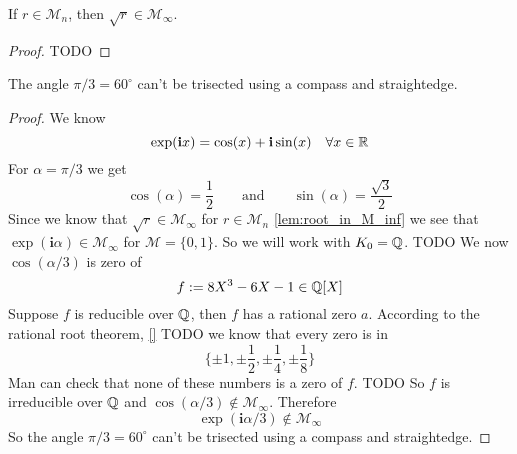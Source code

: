 \documentclass{../Project/TemplateExercise}
\begin{document}
\begin{lemma}
\label{lem:root_in_M_inf}
    If $r\in \mathcal{M}_{n}$, then $\sqrt{r} \in \mathcal{M}_{\infty}$.
\end{lemma}
\begin{proof}
    TODO %
\end{proof}
\begin{lemma}

\end{lemma}
\begin{theorem}
    The angle $\pi / 3 = 60^{\circ}$ can't be trisected using a compass and straightedge.
\end{theorem}
\begin{proof}
    We know
    \begin{equation*}
        \exp(\textbf{i}x) = \cos(x) + \textbf{i} \sin(x) \quad \forall x \in \mathbb{R}
    \end{equation*}
    For $\alpha = \pi / 3$ we get
    \begin{equation*}
        \cos(\alpha) = \frac{1}{2}\qquad \text{and}\qquad \sin(\alpha) = \frac{\sqrt{3}}{2}
    \end{equation*}
    Since we know that $\sqrt{r} \in \mathcal{M}_{\infty}$ for $r \in \mathcal{M}_n$ \ref*{lem:root_in_M_inf}
    we see that $\exp(\textbf{i} \alpha) \in \mathcal{M}_{\infty}$ for $\mathcal{M} = \{0,1\}$. \newline
    So we will work with $K_0 = \mathbb{Q}$. \newline
    TODO \newline %
    We now $\cos(\alpha/3)$ is zero of
    \begin{equation*}
        f := 8 X^3 - 6 X - 1 \in \mathbb{Q}[X]
    \end{equation*}
    Suppose $f$ is reducible over $\mathbb{Q}$, then $f$ has a rational zero $a$. According to the rational root theorem, \ref*{}
        TODO %
     we know that every zero is in
     \begin{equation*}
        \{ \pm 1, \pm \frac{1}{2}, \pm \frac{1}{4}, \pm \frac{1}{8} \}
     \end{equation*}
     Man can check that none of these numbers is a zero of $f$.
     TODO %
     So $f$ is irreducible over $\mathbb{Q}$ and $\cos(\alpha/3) \notin \mathcal{M}_{\infty}$.
     Therefore
        \begin{equation*}
            \exp(\textbf{i} \alpha/3) \notin \mathcal{M}_{\infty}
        \end{equation*}
    So the angle $\pi / 3 = 60^{\circ}$ can't be trisected using a compass and straightedge.
\end{proof}
\end{document}
